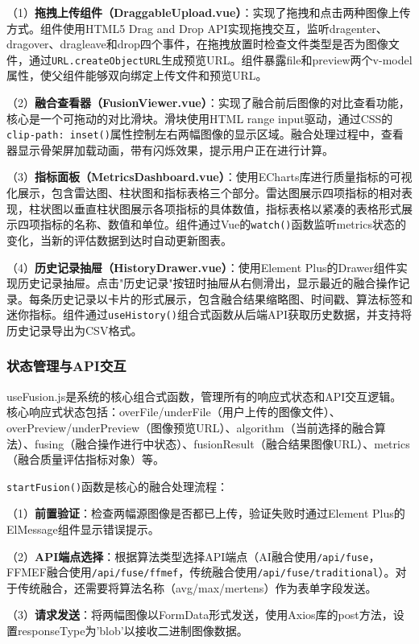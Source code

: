 （1）\textbf{拖拽上传组件（DraggableUpload.vue）}：实现了拖拽和点击两种图像上传方式。组件使用HTML5 Drag and Drop API实现拖拽交互，监听dragenter、dragover、dragleave和drop四个事件，在拖拽放置时检查文件类型是否为图像文件，通过\texttt{URL.createObjectURL}生成预览URL。组件暴露file和preview两个v-model属性，使父组件能够双向绑定上传文件和预览URL。

（2）\textbf{融合查看器（FusionViewer.vue）}：实现了融合前后图像的对比查看功能，核心是一个可拖动的对比滑块。滑块使用HTML range input驱动，通过CSS的\texttt{clip-path: inset()}属性控制左右两幅图像的显示区域。融合处理过程中，查看器显示骨架屏加载动画，带有闪烁效果，提示用户正在进行计算。

（3）\textbf{指标面板（MetricsDashboard.vue）}：使用ECharts库进行质量指标的可视化展示，包含雷达图、柱状图和指标表格三个部分。雷达图展示四项指标的相对表现，柱状图以垂直柱状图展示各项指标的具体数值，指标表格以紧凑的表格形式展示四项指标的名称、数值和单位。组件通过Vue的\texttt{watch()}函数监听metrics状态的变化，当新的评估数据到达时自动更新图表。

（4）\textbf{历史记录抽屉（HistoryDrawer.vue）}：使用Element Plus的Drawer组件实现历史记录抽屉。点击"历史记录"按钮时抽屉从右侧滑出，显示最近的融合操作记录。每条历史记录以卡片的形式展示，包含融合结果缩略图、时间戳、算法标签和迷你指标。组件通过\texttt{useHistory()}组合式函数从后端API获取历史数据，并支持将历史记录导出为CSV格式。

\subsubsection{状态管理与API交互}\label{sec:state_management}

useFusion.js是系统的核心组合式函数，管理所有的响应式状态和API交互逻辑。核心响应式状态包括：overFile/underFile（用户上传的图像文件）、overPreview/underPreview（图像预览URL）、algorithm（当前选择的融合算法）、fusing（融合操作进行中状态）、fusionResult（融合结果图像URL）、metrics（融合质量评估指标对象）等。

\texttt{startFusion()}函数是核心的融合处理流程：

（1）\textbf{前置验证}：检查两幅源图像是否都已上传，验证失败时通过Element Plus的ElMessage组件显示错误提示。

（2）\textbf{API端点选择}：根据算法类型选择API端点（AI融合使用\texttt{/api/fuse}，FFMEF融合使用\texttt{/api/fuse/ffmef}，传统融合使用\texttt{/api/fuse/traditional}）。对于传统融合，还需要将算法名称（avg/max/mertens）作为表单字段发送。

（3）\textbf{请求发送}：将两幅图像以FormData形式发送，使用Axios库的post方法，设置responseType为'blob'以接收二进制图像数据。

